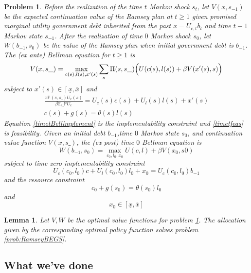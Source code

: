 \documentclass[12pt]{article}
\newcommand{\tjs}[1]{\textcolor{red}{$^{\textrm{tjs}}${#1}}}
\newcommand{\EE}{\mathbb E}
\newtheorem{lemma}[theorem]{Lemma}
\newtheorem{problem}[theorem]{Problem}
\begin{document}
\begin{problem}\label{prob:RamseyBellman}
Before the realization of the time $t$ Markov shock $s_t$, let   $V(x, s_{-1})$ be the {\em expected} continuation value of the Ramsey plan at $t \geq 1$  given promised marginal utility government debt inherited
from the past $x = U_{c,t} b_t $ and time $t-1$ Markov state $s_{-1}$.
After the realization of time $0$ Markov shock $s_0$, let $W(b_{-1},s_0)$ be the value of the Ramsey plan when initial
government debt is $b_{-1}$. %
The (\textit{ex ante}) Bellman equation for $t\geq1$  is
	\begin{equation}\label{eqn:Bellman1}
		V(x,s\_) = \max_{c(s),l(s),x'(s)} \sum_s \Pi(s,s\_)\Bigl(U(c(s),l(s)) + \beta V(x'(s),s)\Bigr)
	\end{equation}
subject to $x'(s)\in [\underline x,\overline x]$ and
	\begin{align}
		\frac{x \mathbb{P}(s,s\_) U_c(s)}{\beta\EE_{s\_} \mathbb{P}U_c} =U_c(s)c(s)+U_l(s)l(s) + x'(s) \label{timetBellimplement}\\
		c(s) + g(s) = \theta(s)l(s) \label{timetfeas}
	\end{align}
Equation \eqref{timetBellimplement} is the implementability constraint and \eqref{timetfeas} is feasibility.
	Given an initial  debt $b_{-1}$,time $0$ Markov state $s_0$,  and continuation value function $V(x,s\_)$, the (\textit{ex post}) time $0$ Bellman equation is
	\begin{equation}\label{eqn:Bellman0}
		W(b_{-1},s_0) = \max_{c_{0},l_0,x_{0}} U(c,l) +\beta V(x_0,s0)
	\end{equation} subject to  time zero implementability constraint
	\[
		U_{c}(c_0,l_0)c + U_l(c_0,l_0) l_0 + x_0 = U_c(c_0,l_0) b_{-1}
	\]and  the resource constraint
	\[
		c_0+ g(s_0) = \theta(s_0) l_0
	\]and
	\[
		x_0 \in [\underline x,\overline x]
	\]
\end{problem}
\begin{lemma}  Let $V, W$ be the optimal value functions for  problem \ref{prob:RamseyBellman}.  The allocation given by the  corresponding optimal policy function solves problem \ref{prob:RamseyBEGS}.
\end{lemma}

\subsection{What we've done}
\end{document}
